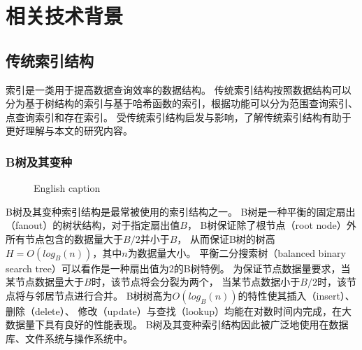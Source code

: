 \chapter{相关技术背景}
\label{chap:back}

\section{传统索引结构}

索引是一类用于提高数据查询效率的数据结构。
传统索引结构按照数据结构可以分为基于树结构的索引与基于哈希函数的索引，根据功能可以分为范围查询索引、点查询索引和存在索引。
{\li}受传统索引结构启发与影响，了解传统索引结构有助于更好理解{\li}与本文的研究内容。

\subsection{B树及其变种}

\begin{figure}[!htp]
  \centering
    {English caption}
  \label{fig:btree}
\end{figure}

B树及其变种索引结构是最常被使用的索引结构之一\cite{graefe2001b}。
B树是一种平衡的固定扇出（fanout）的树状结构，对于指定扇出值$B$，
B树保证除了根节点（root node）外所有节点包含的数据量大于$B/2$并小于$B$，
从而保证B树的树高$H=O(log_B(n))$，其中$n$为数据量大小。
平衡二分搜索树（balanced binary search tree）可以看作是一种扇出值为$2$的B树特例。
为保证节点数据量要求，当某节点数据量大于$B$时，该节点将会分裂为两个，
当某节点数据小于$B/2$时，该节点将与邻居节点进行合并。
B树树高为$O(log_B(n))$的特性使其插入（insert）、删除（delete）、
修改（update）与查找（lookup）均能在对数时间内完成，在大数据量下具有良好的性能表现。
B树及其变种索引结构因此被广泛地使用在数据库、文件系统与操作系统中。


